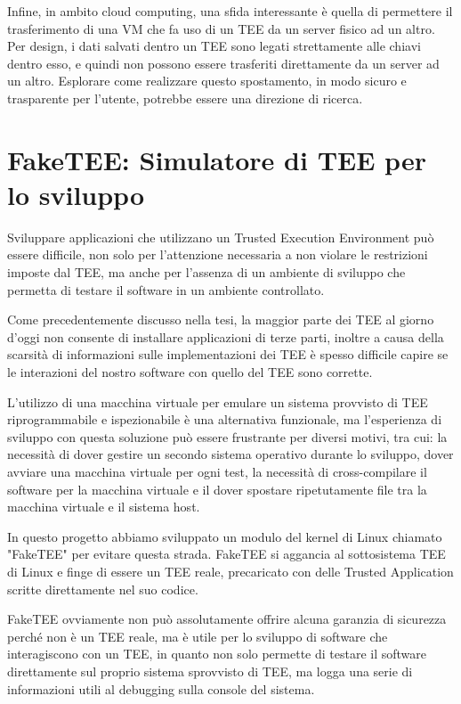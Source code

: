 \documentclass[12pt,italian]{report}
\begin{document}
Infine, in ambito cloud computing, una sfida interessante è quella di permettere
il trasferimento di una VM che fa uso di un TEE da un server fisico ad un altro.
Per design, i dati salvati dentro un TEE sono legati strettamente alle chiavi
dentro esso, e quindi non possono essere trasferiti direttamente da un
server ad un altro.
Esplorare come realizzare questo spostamento,
in modo sicuro e trasparente per l'utente, potrebbe essere una direzione di ricerca.

\appendix
\chapter{FakeTEE: Simulatore di TEE per lo sviluppo}
\label{app:faketee}
Sviluppare applicazioni che utilizzano un Trusted Execution Environment può
essere difficile, non solo per l'attenzione necessaria a non violare
le restrizioni imposte dal TEE, ma anche per l'assenza di un ambiente di
sviluppo che permetta di testare il software in un ambiente controllato.

Come precedentemente discusso nella tesi, la maggior parte dei TEE al giorno
d'oggi non consente di installare applicazioni di terze parti, inoltre
a causa della scarsità di informazioni sulle implementazioni dei TEE
è spesso difficile capire se le interazioni del nostro software con quello
del TEE sono corrette.

L'utilizzo di una macchina virtuale per emulare un sistema provvisto di TEE
riprogrammabile e ispezionabile è una alternativa funzionale, ma
l'esperienza di sviluppo con questa soluzione può essere frustrante per
diversi motivi, tra cui: la necessità di dover gestire un secondo sistema
operativo durante lo sviluppo, dover avviare una macchina virtuale per ogni
test, la necessità di cross-compilare il software per la macchina virtuale
e il dover spostare ripetutamente file tra la macchina virtuale e il sistema
host.

In questo progetto abbiamo sviluppato un modulo del kernel di Linux chiamato
"FakeTEE" per evitare questa strada. FakeTEE si aggancia al sottosistema TEE
di Linux e finge di essere un TEE reale, precaricato con delle
Trusted Application scritte direttamente nel suo codice.

FakeTEE ovviamente non può assolutamente offrire alcuna garanzia di sicurezza
perché non è un TEE reale, ma è utile per lo sviluppo di software che
interagiscono con un TEE, in quanto non solo permette di testare il software
direttamente sul proprio sistema sprovvisto di TEE, ma logga una serie di
informazioni utili al debugging sulla console del sistema.
\end{document}
